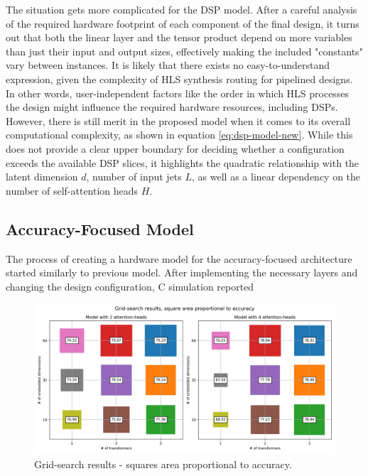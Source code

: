 The situation gets more complicated for the DSP model. After a careful analysis of the required hardware footprint of each component of the final design, it turns out that both the linear layer and the tensor product depend on more variables than just their input and output sizes, effectively making the included "constants" vary between instances. It is likely that there exists no easy-to-understand expression, given the complexity of HLS synthesis routing for pipelined designs. In other words, user-independent factors like the order in which HLS processes the design might influence the required hardware resources, including DSPs. However, there is still merit in the proposed model when it comes to its overall computational complexity, as shown in equation \ref{eq:dsp-model-new}. While this does not provide a clear upper boundary for deciding whether a configuration exceeds the available DSP slices, it highlights the quadratic relationship with the latent dimension \(d\), number of input jets \(L\), as well as a linear dependency on the number of self-attention heads \(H\).

\subsection{Accuracy-Focused Model}
The process of creating a hardware model for the accuracy-focused architecture started similarly to previous model. After implementing the necessary layers and changing the design configuration, C simulation reported 


\indo{|}
\indo{|}

\begin{figure}[hpt!]
  \centering
  \includegraphics[trim={0cm 0cm 0cm 1cm}, clip, width=1.0\textwidth, center]{../logs/grid_search.png}
  \caption{Grid-search results - squares area proportional to accuracy.}
  \label{fig:grid-search}
\end{figure}

